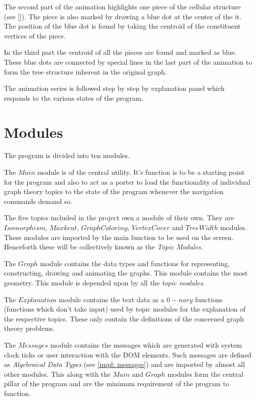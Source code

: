 The second part of the animation highlights one piece of the cellular structure
(see \autoref{}). The piece is also marked by drawing a blue dot at the center
of the it. The position of the blue dot is found by  taking the centroid of the
constituent vertices of the piece.

In the third part the centroid of all the pieces are found and marked as blue.
These blue dots are connected by special lines in the last part of the
animation to form the tree structure inherent in the original graph.

The animation series is followed step by step by explanation panel which responds
to the various states of the program.

\section{Modules}

The program is divided into ten modules.

The $Main$ module is of the central utility. It's function is to be a
starting point for the program and also to act as a porter to load the
functionality of individual graph theory topics to the state of the program
whenever the navigation commands demand so. 

The five topics included in the project own a module of their own. They are
$Isomorphism$, $Maxkcut$, $GraphColoring$, $VertexCover$ and $TreeWidth$ modules.
These modules are imported by the main function to be used on the screen.
Henceforth these will be collectively known as the \emph{Topic Modules}.

The $Graph$ module contains the data types and functions for representing,
constructing, drawing and animating the graphs. This module contains the most
geometry. This module is depended upon by all the \emph{topic modules}.

The $Explanation$ module contains the text data as a $0-nary$ functions
(functions which don't take input) used by topic modules for the explanation of
the respective topics. These only contain the definitions of the concerned
graph theory problems.

The $Messages$ module contains the messages which are generated with system
clock ticks or user interaction with the DOM elements.  Such messages are
defined as \emph{Algebraical Data Types} (see \autoref{impl: messages}) and are
imported by almost all other modules. This along with the $Main$ and $Graph$
modules form the central pillar of the program and are the minimum requirement
of the program to function.

